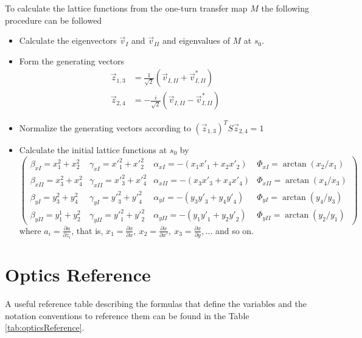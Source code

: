 \documentclass[english]{article}
\begin{document}
To calculate the lattice functions from the one-turn transfer map $M$ the 
following procedure can be followed
\begin{itemize}
    \item Calculate the eigenvectors $\vec{v}_I$ and $\vec{v}_{II}$ and 
    eigenvalues of $M$ at $s_0$.
    \item Form the generating vectors
        \begin{align*}
            \vec{z}_{1,3} &= \frac{1}{\sqrt{2}} (\vec{v}_{I,II}
                                +\vec{v}^*_{I,II}) \\
            \vec{z}_{2,4} &= -\frac{i}{\sqrt{2}} (\vec{v}_{I,II}
                                -\vec{v}^*_{I,II}) 
        \end{align*}
    \item Normalize the generating vectors according to 
    $(\vec{z}_{1,3})^T S \vec{z}_{2,4}=1$
    \item Calculate the initial lattice functions at $s_0$ by
        \begin{equation*}
            \left(
                \begin{array}{cccc}
                    \beta_{xI}=x_1^2+x_2^2 & \gamma_{xI}={x'}_1^2+{x'}_2^2 &
                    \alpha_{xI}=-(x_1{x'}_1+x_2{x'}_2) & \Phi_{xI}=\arctan(x_2/x_1) \\
                    \beta_{xII}=x_3^2+x_4^2 & \gamma_{xII}={x'}_3^2+{x'}_4^2 &
                    \alpha_{xII}=-(x_3{x'}_3+x_4{x'}_4) & \Phi_{xII}=\arctan(x_4/x_3) \\ 
                    \beta_{yI}=y_3^2+y_4^2 & \gamma_{yI}={y'}_3^2+{y'}_4^2 &
                    \alpha_{yI}=-(y_3{y'}_3+y_4{y'}_4) & \Phi_{yI}=\arctan(y_4/y_3) \\
                    \beta_{yII}=y_1^1+y_2^2 & \gamma_{yII}={y'}_1^2+{y'}_2^2 &
                    \alpha_{yII}=-(y_1{y'}_1+y_2{y'}_2) & \Phi_{yII}=\arctan(y_2/y_1) 
                \end{array}
            \right)
        \end{equation*}
        where   $a_i=\frac{\partial{a}}{\partial{z_i}}$, that is, $x_1=\frac{\partial{x}}{\partial{x}},~x_2=\frac{\partial{x}}{\partial{x'}},~x_3=\frac{\partial{x}}{\partial{y}},...$ and so on.
\end{itemize}

\section{Optics Reference}
A useful reference table describing the formulas that define the variables and the notation conventions to reference them can be found in the Table \ref{tab:opticsReference}.
\end{document}
